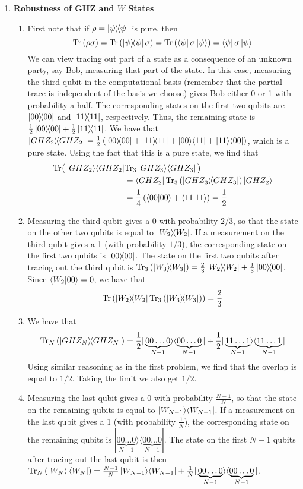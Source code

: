 \documentclass[12pt]{article}
\begin{document}
\begin{enumerate}
\item {\bf Robustness of GHZ and $W$ States}\label{ex:robust-GHZ}
\begin{enumerate}
\item
	First note that if $\rho = \ket{\psi}\!\!\bra{\psi}$ is pure, then
	\[\mathrm{Tr}\left(\rho \sigma\right) = \mathrm{Tr}\left(\ket{\psi}\!\!\bra{\psi} \sigma\right) = \mathrm{Tr}\left(\bra{\psi} \sigma\ket{\psi}\right) = \bra{\psi} \sigma\ket{\psi}\]
	We can view tracing out part of a state as a consequence of an unknown party, say Bob, measuring that part of the state. In this case, measuring the third qubit in the computational basis (remember that the partial trace is independent of the basis we choose) gives Bob either 0 or 1 with probability a half. The corresponding states on the first two qubits are $\ket{00}\!\!\bra{00}$ and $\ket{11}\!\!\bra{11}$, respectively. Thus, the remaining state is $\frac{1}{2}\ket{00}\!\!\bra{00}+\frac{1}{2}\ket{11}\!\!\bra{11}$.
	We have that $\proj{GHZ_2} = \frac{1}{2}\left(\proj{00}+\proj{11}+\ketbra{00}{11}+\ketbra{11}{00} \right)$, which is a pure state. Using the fact that this is a pure state, we find that
	\begin{align*}
		\mathrm{Tr}\big(\ket{GHZ_2}\!\bra{GHZ_2} & \mathrm{Tr}_3\ket{GHZ_3}\!\bra{GHZ_3}\big) \\
		& = \bra{GHZ_2} \mathrm{Tr}_3 \left(\ket{GHZ_3}\!\!\bra{GHZ_3}\right)\ket{GHZ_2}\\
		& = \frac{1}{4}\left(\langle 00 \vert 00\rangle+\langle 11 \vert 11\rangle\right)=\frac{1}{2}
	\end{align*}
\item
	Measuring the third qubit gives a 0 with probability $2/3$, so that the state on the other two qubits is equal to $\ket{W_2}\!\!\bra{W_2}$. If a measurement on the third qubit gives a 1 (with probability $1/3$), the corresponding state on the first two qubits is $\ket{00}\!\!\bra{00}$. The state on the first two qubits after tracing out the third qubit is $\mathrm{Tr}_3\left(\ket{W_3}\!\!\bra{W_3}\right) = \frac{2}{3}\ket{W_2}\!\!\bra{W_2}+\frac{1}{3}\ket{00}\!\!\bra{00}$.
	Since $\langle{W_2}|{00}\rangle = 0$, we have that $$\mathrm{Tr}\left(\ket{W_2}\!\!\bra{W_2} \mathrm{Tr}_3\left(\ket{W_3}\!\!\bra{W_3}\right)\right) = \frac{2}{3}$$
\item
	We have that
	\[\mathrm{Tr}_N \left(\ket{GHZ_N}\!\!\bra{GHZ_N}\right) = \frac{1}{2}|\underbrace{00\ldots0}_{N-1}\rangle\langle\underbrace{00\ldots0}_{N-1}|+\frac{1}{2}|\underbrace{11\ldots1}_{N-1}\rangle\langle\underbrace{11\ldots1}_{N-1}|\]
	Using similar reasoning as in the first problem, we find that the overlap is equal to $1/2$. Taking the limit we also get $1/2$.
\item	
	Measuring the last qubit gives a $0$ with probability $\frac{N-1}{N}$, so that the state on the remaining qubits is equal to $\ket{W_{N-1}}\!\bra{W_{N-1}}$. If a measurement on the last qubit gives a 1 (with probability $\frac{1}{N}$), the corresponding state on the remaining qubits is $|\underbrace{00\ldots0}_{N-1}\rangle \langle\underbrace{00\ldots0}_{N-1} |$. The state on the first $N-1$ qubits after tracing out the last qubit is then $\mathrm{Tr}_N\left(\left| W_N \right\rangle \left\langle W_N \right|\right) = \frac{N-1}{N}\ket{W_{N-1}}\!\bra{W_{N-1}}+\frac{1}{N}|\underbrace{00\ldots0}_{N-1}\rangle \langle \underbrace{00\ldots0}_{N-1}|$.

\end{enumerate}
\end{enumerate}
\end{document}
